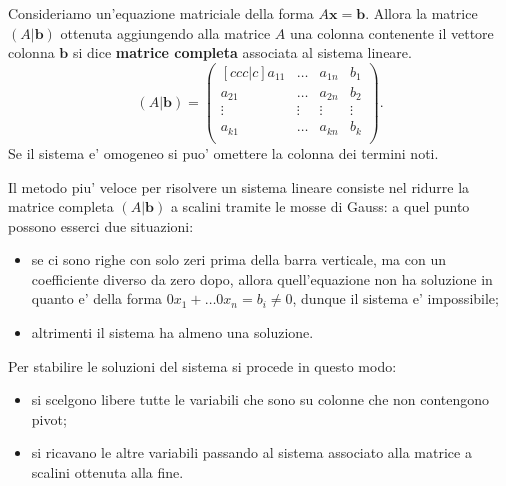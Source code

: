\begin{definition}
    Consideriamo un'equazione matriciale della forma $A\bm{x} = \bm b$. Allora la matrice $(A|\bm b)$ ottenuta aggiungendo alla matrice $A$ una colonna contenente il vettore colonna $\bm b$ si dice \textbf{matrice completa} associata al sistema lineare.
    \begin{equation}
        (A|\bm b) = \begin{pmatrix}[ccc|c]
            a_{11} & \dots & a_{1n} & b_1\\
            a_{21} & \dots & a_{2n} & b_2\\
            \vdots & \vdots& \vdots & \vdots\\
            a_{k1} & \dots & a_{kn} & b_k\\
        \end{pmatrix}.
    \end{equation}
    Se il sistema e' omogeneo si puo' omettere la colonna dei termini noti.
\end{definition}


Il metodo piu' veloce per risolvere un sistema lineare consiste nel ridurre la matrice completa $(A|\bm b)$ a scalini tramite le mosse di Gauss: a quel punto possono esserci due situazioni:
\begin{itemize}
    \item se ci sono righe con solo zeri prima della barra verticale, ma con un coefficiente diverso da zero dopo, allora quell'equazione non ha soluzione in quanto e' della forma $0x_1 + \dots 0x_n = b_i \neq 0$, dunque il sistema e' impossibile;
    \item altrimenti il sistema ha almeno una soluzione.
\end{itemize}
Per stabilire le soluzioni del sistema si procede in questo modo:
\begin{itemize}
    \item si scelgono libere tutte le variabili che sono su colonne che non contengono pivot;
    \item si ricavano le altre variabili passando al sistema associato alla matrice a scalini ottenuta alla fine.
\end{itemize}

